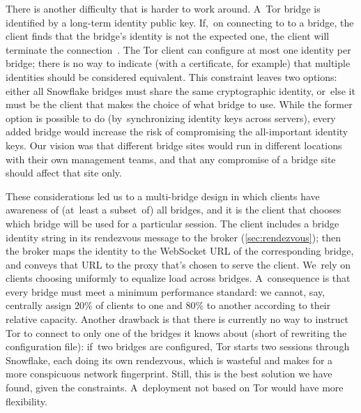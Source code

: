 \documentclass[letterpaper,twocolumn]{article}
\begin{document}
There is another difficulty that is harder to work around.
A~Tor bridge is identified
by a long-term identity public key.
If,~on connecting to to a bridge,
the client finds that the bridge's identity is not the expected one,
the client will terminate the connection~\cite[\S 4.2]{tor-spec}.
The Tor client can configure at most one identity per bridge;
there is no way to indicate (with a certificate, for example)
that multiple identities should be considered equivalent.
This constraint leaves two options:
either all Snowflake bridges must share the same cryptographic identity,
or~else it must be the client that makes the choice of what bridge to use.
While the former option is possible to do
(by~synchronizing identity keys across servers),
every added bridge would increase the risk of compromising
the all-important identity keys.
Our vision was that different bridge sites
would run in different locations
with their own management teams,
and that any compromise of a bridge site
should affect that site only.

These considerations led us to a multi-bridge design
in which clients have awareness of (at~least a subset~of) all bridges,
and it is the client that chooses which bridge will be used
for a particular session.
The client includes a bridge identity string
in its rendezvous message to the broker (\autoref{sec:rendezvous});
then the broker maps the identity to the WebSocket URL
of the corresponding bridge,
and conveys that URL to the proxy
that's chosen to serve the client.
We~rely on clients choosing uniformly
to equalize load across bridges.
A~consequence is that
every bridge must meet a minimum performance standard:
we cannot, say,
centrally assign 20\% of clients to one and 80\% to another
according to their relative capacity.
Another drawback is that there is currently no way to instruct Tor
to connect to only one of the bridges it knows about
(short of rewriting the configuration file):
if~two bridges are configured, Tor starts two sessions through Snowflake,
each doing its own rendezvous,
which is wasteful and makes for a more conspicuous network fingerprint.
Still, this is the best solution we have found, given the constraints.
A~deployment not based on Tor
would have more flexibility.
\end{document}
